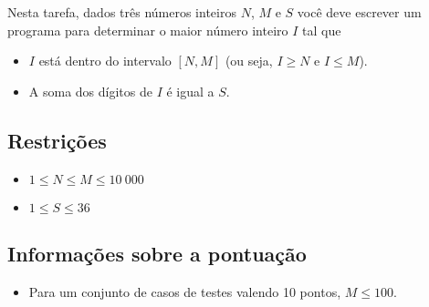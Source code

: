 %

Nesta tarefa, dados três números inteiros $N$, $M$ e $S$ você deve escrever um programa para determinar
o maior número inteiro $I$ tal que

\begin{itemize}
\item $I$ está dentro do intervalo $[N, M]$ (ou seja,  $I \ge N$ e $I \le M$).
\item A soma dos dígitos de $I$ é igual a $S$.
\end{itemize}

%
%

%


\subsection*{Restrições}
\begin{itemize}
\item $1 \leq N \leq M \leq 10\ 000$
\item $1 \leq S \leq 36$
\end{itemize}

\subsection*{Informações sobre a pontuação}
\begin{itemize}
\item Para um conjunto de casos de testes valendo 10 pontos, $M \le 100$.
\end{itemize}


\sampleio
